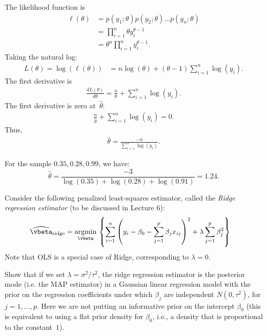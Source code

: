 \documentclass[12pt, answers]{exam}
\def\betahat{\widehat{\vbeta}}
\def\({\left(}
\def\){\right)}
\begin{document}
\begin{questions}
\begin{solution}
The likelihood function is
\begin{align*}
\ell(\theta)&=p(y_1;\theta)p(y_2;\theta)\ldots p(y_n;\theta)\\
&=\prod_{i=1}^n \theta y^{\theta-1}_i\\
&=\theta^n \prod_{i=1}^n y^{\theta-1}_i.
\end{align*}
Taking the natural log:
\begin{align*}
L(\theta)=\log(\ell(\theta))&=n \log(\theta)+(\theta-1)\sum_{i=1}^n \log(y_i).
\end{align*}
The first derivative is
\begin{align*}
\frac{d L(\theta)}{d \theta}=\frac{n}{\theta}+\sum_{i=1}^n \log(y_i).
\end{align*}
The first derivative is zero at~$\widehat{\theta}$:
\begin{align*}
\frac{n}{\widehat{\theta}}+\sum_{i=1}^n \log(y_i)=0.
\end{align*}
Thus,
\begin{align*}
\widehat{\theta}=\frac{-n}{\sum_{i=1}^n \log(y_i)}.
\end{align*}

\medskip

For the sample $0.35, 0.28, 0.99$, we have:
\begin{equation*}
\widehat{\theta}=\frac{-3}{\log(0.35)+\log(0.28)+\log(0.91)}=1.24.
\end{equation*}


\end{solution}


\clearpage
\question

Consider the following penalized least-squares estimator, called the \textit{Ridge regression estimator} (to be discussed in Lecture 6):
\begin{align*}
\betahat_{\text{ridge}} &= \underset{\vbeta}{\text{argmin}}\, \left\{ \sum_{i=1}^n\(y_i-\beta_0-\sum_{j=1}^{p}\beta_jx_{ij}\)^2 + \lambda \sum_{j=1}^{p}\beta_j^2\right\}
\end{align*}
Note that OLS is a special case of Ridge, corresponding to $\lambda=0$.



Show that if we set $\lambda=\sigma^2/\tau^2$, the ridge regression estimator is the posterior mode (i.e. the MAP estimator) in a Gaussian linear regression model with the prior on the regression coefficients under which $\beta_j$ are independent $N(0,\tau^2)$, for $j=1,...,p$.  Here we are not putting an informative prior on the intercept $\beta_0$ {\footnotesize(this is equivalent to using a flat prior density for $\beta_0$, i.e., a density that is proportional to the constant~$1$)}.




\end{questions}
\end{document}
